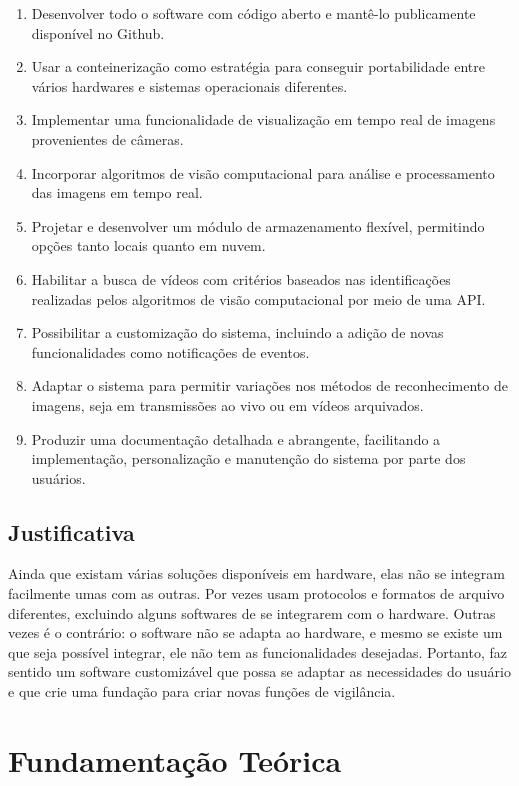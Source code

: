 \documentclass[12pt, %
openright, 
oneside, %
a4paper,    %
brazil]{facom-ufu-abntex2}
\begin{document}
\begin{enumerate}
	\item Desenvolver todo o software com código aberto e mantê-lo
	      publicamente disponível no Github.
	\item Usar a conteinerização como estratégia para conseguir
	      portabilidade entre vários hardwares e sistemas operacionais diferentes.
	\item Implementar uma funcionalidade de visualização em tempo real de
	      imagens provenientes de câmeras.
	\item Incorporar algoritmos de visão computacional para análise e
	      processamento das imagens em tempo real.
	\item Projetar e desenvolver um módulo de armazenamento flexível,
	      permitindo opções tanto locais quanto em nuvem.
	\item Habilitar a busca de vídeos com critérios baseados nas
	      identificações realizadas pelos algoritmos de visão computacional por meio de
	      uma API.
	\item Possibilitar a customização do sistema, incluindo a adição de
	      novas funcionalidades como notificações de eventos.
	\item Adaptar o sistema para permitir variações nos métodos de
	      reconhecimento de imagens, seja em transmissões ao vivo ou em vídeos
	      arquivados.
	\item Produzir uma documentação detalhada e abrangente, facilitando a
	      implementação, personalização e manutenção do sistema por parte dos usuários.
\end{enumerate}

\section{Justificativa}

Ainda que existam várias soluções disponíveis em hardware, elas não se integram
facilmente umas com as outras. Por vezes usam protocolos e formatos de arquivo
diferentes, excluindo alguns softwares de se integrarem com o hardware. Outras
vezes é o contrário: o software não se adapta ao hardware, e mesmo se existe um
que seja possível integrar, ele não tem as funcionalidades desejadas. Portanto,
faz sentido um software customizável que possa se adaptar as necessidades do
usuário e que crie uma fundação para criar novas funções de vigilância.

\chapter{Fundamentação Teórica}
\end{document}
